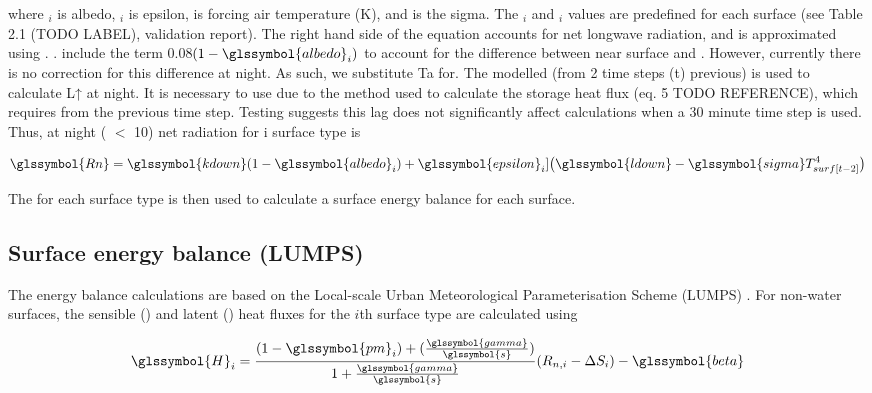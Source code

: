 \documentclass[final,3p,times,authoryear]{elsarticle}
\begin{document}
where $_{i}$ is \glsdesc{albedo}, $_{i}$ is \glsdesc{epsilon},  is forcing air temperature (K), and  is the \glsdesc{sigma}. The $_{i}$ and $_{i}$ values are predefined for each surface (see  Table 2.1 (TODO LABEL), validation report).  The right hand side of the equation accounts for net longwave radiation, and  is approximated using . \cite{Loridan2011}. include the term 0.08$(1-\glssymbol{albedo}_{i})$ to account for the difference between near surface  and . However, currently there is no correction for this difference at night. As such, we substitute Ta for. The modelled  (from 2 time steps (t) previous) is used to calculate L↑ at night. It is necessary to use  due to the method used to calculate the storage heat flux (eq. 5 TODO REFERENCE), which requires  from the previous time step.  Testing suggests this lag does not significantly affect calculations when a 30 minute time step is used. Thus, at night ( $<$ 10) net radiation for i surface type is

\begin{equation} 
\glssymbol{Rn}  
 = \glssymbol{kdown} 
 (1-\glssymbol{albedo}_{i}) + \glssymbol{epsilon}_{i}] \big(\glssymbol{ldown}-\glssymbol{sigma} T_{surf[t-2]}^{4} \big) 
\label{eq:rn2} \end{equation} 


The  for each surface type is then used to calculate a surface energy balance for each surface. 
\subsection{Surface energy balance (LUMPS)}\label{sec:lumps}

The energy balance calculations are based on the Local-scale Urban Meteorological Parameterisation Scheme (LUMPS) \citep{Grimmond2002a}. For non-water surfaces, the sensible () and latent () heat fluxes for the $i$th surface type are calculated using


\begin{equation} 
\glssymbol{H}_{i} = 
\frac{(1-\glssymbol{pm}_{i})+(\frac{\glssymbol{gamma}}{\glssymbol{s}})}{1+\frac{\glssymbol{gamma}}{\glssymbol{s}}}
(R_{n,i} -\Delta S_{i})- \glssymbol{beta}
\label{eq:H} \end{equation} 
\end{document}
